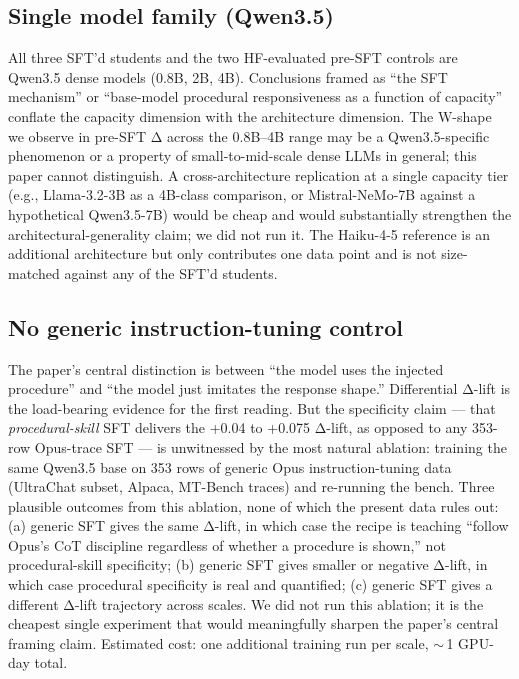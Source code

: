 \documentclass[10pt]{article}
\begin{document}
\subsection{Single model family (Qwen3.5)}\label{sec:single-family}
All three SFT'd students and the two HF-evaluated pre-SFT controls are Qwen3.5 dense models (0.8B, 2B, 4B). Conclusions framed as ``the SFT mechanism'' or ``base-model procedural responsiveness as a function of capacity'' conflate the capacity dimension with the architecture dimension. The W-shape we observe in pre-SFT Δ across the 0.8B--4B range may be a Qwen3.5-specific phenomenon or a property of small-to-mid-scale dense LLMs in general; this paper cannot distinguish. A cross-architecture replication at a single capacity tier (e.g., Llama-3.2-3B as a 4B-class comparison, or Mistral-NeMo-7B against a hypothetical Qwen3.5-7B) would be cheap and would substantially strengthen the architectural-generality claim; we did not run it. The Haiku-4-5 reference is an additional architecture but only contributes one data point and is not size-matched against any of the SFT'd students.

\subsection{No generic instruction-tuning control}\label{sec:no-generic-sft}
The paper's central distinction is between ``the model uses the injected procedure'' and ``the model just imitates the response shape.'' Differential Δ-lift is the load-bearing evidence for the first reading. But the specificity claim --- that \emph{procedural-skill} SFT delivers the +0.04 to +0.075 Δ-lift, as opposed to any 353-row Opus-trace SFT --- is unwitnessed by the most natural ablation: training the same Qwen3.5 base on 353 rows of generic Opus instruction-tuning data (UltraChat subset, Alpaca, MT-Bench traces) and re-running the bench. Three plausible outcomes from this ablation, none of which the present data rules out: (a) generic SFT gives the same Δ-lift, in which case the recipe is teaching ``follow Opus's CoT discipline regardless of whether a procedure is shown,'' not procedural-skill specificity; (b) generic SFT gives smaller or negative Δ-lift, in which case procedural specificity is real and quantified; (c) generic SFT gives a different Δ-lift trajectory across scales. We did not run this ablation; it is the cheapest single experiment that would meaningfully sharpen the paper's central framing claim. Estimated cost: one additional training run per scale, $\sim$\,1 GPU-day total.
\end{document}
